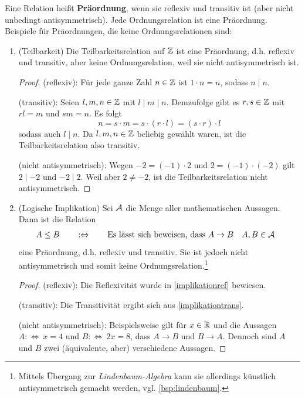 \begin{bsp}[* Präordnungen] 
    Eine Relation heißt \textbf{Präordnung}, wenn sie reflexiv und transitiv ist (aber nicht unbedingt antisymmetrisch). Jede Ordnungsrelation ist eine Präordnung. Beispiele für Präordnungen, die keine Ordnungsrelationen sind:
    \begin{enumerate}
        \item(Teilbarkeit) Die Teilbarkeitsrelation auf $\mathbb Z$ ist eine Präordnung, d.h. reflexiv und transitiv, aber keine Ordnungsrelation, weil sie nicht antisymmetrisch ist.
        \begin{proof}
            (reflexiv): Für jede ganze Zahl $n\in \mathbb Z$ ist $1\cdot n=n$, sodass $n\mid n$.

            (transitiv): Seien $l,m,n\in \mathbb Z$ mit $l\mid m\mid n$. Demzufolge gibt es $r,s\in \mathbb Z$ mit $rl=m$ und $sm=n$. Es folgt
                \[ n = s\cdot m = s\cdot (r\cdot l) = (s\cdot r)\cdot l \]
            sodass auch $l\mid n$. Da $l,m,n\in\mathbb Z$ beliebig gewählt waren, ist die Teilbarkeitsrelation also transitiv.

            (nicht antisymmetrisch): Wegen $-2=(-1)\cdot 2$ und $2=(-1)\cdot (-2)$ gilt $2\mid -2$ und $-2\mid 2$. Weil aber $2\neq -2$, ist die Teilbarkeitsrelation nicht antisymmetrisch.
        \end{proof}
        \item(Logische Implikation) Sei $\mathcal A$ die Menge aller mathematischen Aussagen. Dann ist die Relation
        \begin{align*}
            A\le B \qquad &:\Leftrightarrow\qquad  \text{Es lässt sich beweisen, dass $A\to B$} && A,B\in \mathcal A
        \end{align*}
        eine Präordnung, d.h. reflexiv und transitiv. Sie ist jedoch nicht antisymmetrisch und somit keine Ordnungsrelation.\footnote{Mittels Übergang zur \emph{Lindenbaum-Algebra} kann sie allerdings künstlich antisymmetrisch gemacht werden, vgl. \cref{bsp:lindenbaum}.}
        \begin{proof}
            (reflexiv): Die Reflexivität wurde in \cref{implikationref} bewiesen.

            (transitiv): Die Transitivität ergibt sich aus \cref{implikationtrans}.

            (nicht antisymmetrisch): Beispielsweise gilt für $x\in\mathbb R$ und die Aussagen $A:\Leftrightarrow\ x=4$ und $B:\Leftrightarrow\ 2x=8$, dass $A\to B$ und $B\to A$. Dennoch sind $A$ und $B$ zwei (äquivalente, aber) verschiedene Aussagen.
        \end{proof}
    \end{enumerate}
\end{bsp}


